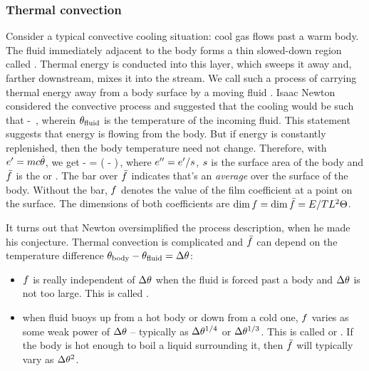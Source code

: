 \subsubsection{Thermal convection}
Consider a typical convective cooling situation: cool gas flows past a warm body. The fluid immediately adjacent to the body forms a thin slowed-down region called . Thermal energy is conducted into this layer, which sweeps it away and, farther downstream, mixes it into the stream. We call such a process of carrying thermal energy away from a body surface by a moving fluid . Isaac Newton considered the convective process and suggested that the cooling would be such that
\beq
\dt\temp{} \propto \temp{} - \temp{}\,,
\eeq
wherein $\theta_\text{fluid}$ is the temperature of the incoming fluid. This statement suggests that energy is flowing from the body. But if energy is constantly replenished, then the body temperature need not change. Therefore, with ${e}^{\prime} = mc\dot{\theta}$, we get
\beq
\flow\then \propto \temp{} - \temp{}\implies
\flux\then = \kavthconv\left(\temp{} - \temp{}\right)\,,
\eeq
where ${e}^{\prime\prime} = {e}^{\prime}/s$, $s$ is the surface area of the body and $\bar{f}$ is the  or . The bar over $\bar{f}$ indicates that's an \emph{average} over the surface of the body. Without the bar, $f$ denotes the  value of the film coefficient at a point on the surface. The dimensions of both coefficients are $\dim f = \dim\bar{f} = E/TL^2\Theta$.

It turns out that Newton oversimplified the process description, when he made his conjecture. Thermal convection is complicated and $\bar{f}$ can depend on the temperature difference $\theta_\text{body} - \theta_\text{fluid} = \Delta\theta$:
\begin{itemize}
\item $f$ is really independent of $\Delta\theta$ when the fluid is forced past a body and $\Delta\theta$ is not too large. This is called .
%
\item when fluid buoys up from a hot body or down from a cold one, $f$ varies as some weak power of $\Delta\theta$ -- typically as $\Delta\theta^{1/4}$ or $\Delta\theta^{1/3}$. This is called  or . If the body is hot enough to boil a liquid surrounding it, then $\bar{f}$ will typically vary as $\Delta\theta^{2}$.
\end{itemize}

